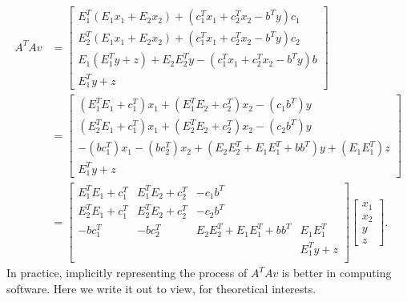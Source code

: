 \documentclass[12pt]{report}
\begin{document}
            \begin{align*}
                A^TAv &= 
                \begin{bmatrix}
                    E^T_1(E_1x_1 + E_2x_2) + (c_1^Tx_1 + c_2^Tx_2 - b^Ty)c_1
                    \\
                    E^T_2(E_1x_1 + E_2x_2) + (c_1^Tx_1 + c_2^Tx_2 - b^Ty)c_2
                    \\
                    E_1(E_1^Ty + z) + E_2E_2^Ty - (c_1^Tx_1 + c_2^Tx_2 - b^Ty)b
                    \\
                    E_1^Ty + z
                \end{bmatrix}
                \\
                &= 
                \begin{bmatrix}
                    (E_1^TE_1 + c_1^T)x_1 + (E_1^TE_2 + c_2^T)x_2 - (c_1b^T)y
                    \\
                    (E_2^TE_1 + c_1^T)x_1 + (E_2^TE_2 + c_2^T)x_2 - (c_2b^T)y
                    \\
                    -(bc_1^T)x_1 - (bc_2^T)x_2 + (E_2E_2^T + E_1E_1^T + bb^T)y
                    + (E_1E_1^T)z
                    \\
                    E_1^Ty + z
                \end{bmatrix}
                \\
                &= 
                \begin{bmatrix}
                    E_1^TE_1 + c_1^T & E_1^TE_2 + c_2^T & -c_1b^T & \\
                    E_2^TE_1 + c_1^T & E_2^TE_2 + c_2^T & -c_2b^T & \\
                    -bc_1^T& -bc_2^T & E_2E_2^T + E_1E_1^T + bb^T & E_1E_1^T \\
                    & & & E_1^Ty + z\\
                \end{bmatrix}
                \begin{bmatrix}
                    x_1 \\ x_2 \\ y \\ z
                \end{bmatrix}. 
            \end{align*}
            In practice, implicitly representing the process of $A^TAv$ is better in computing software. 
            Here we write it out to view, for theoretical interests. 
            \par
\end{document}
